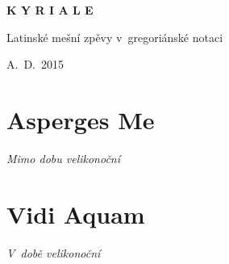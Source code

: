 \documentclass[12pt]{article} %
\newcommand{\info}[2]{\large\textsc{#1}\hfill{\em #2}}
\begin{document}
\begin{titlepage}
  \begin{center}

    { \vspace*{60 mm} }
    \begin{Huge}\textbf{K Y R I A L E}\end{Huge}

    \vspace{30 mm}
    \begin{Large}{Latinské mešní zpěvy v~gregoriánské notaci}\end{Large}

    \vspace{110 mm}
    \begin{large}{A.~D.~2015}\end{large}

  \end{center}
\end{titlepage}





\def\greinitialformat#1{{\fontsize{43}{43}\selectfont #1}}

\redlines




\newpage
\section{Asperges Me}
\info{}{Mimo dobu velikonoční}

\vspace{0.5 cm}
\vspace{1 cm}



\vspace{1 cm}




\section{Vidi Aquam}
\info{}{V~době velikonoční}
\end{document}

